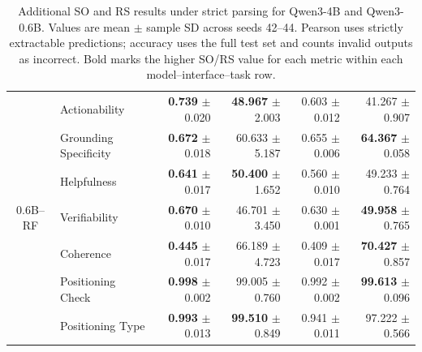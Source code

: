 \begin{table}[!t]
{\begin{tabular*}{\textwidth}{@{\extracolsep{\fill}}clrrrr@{}}
\multirow{7}{*}{0.6B--RF}
& Actionability & \textbf{0.739} $\pm$ 0.020 & \textbf{48.967} $\pm$ 2.003 & 0.603 $\pm$ 0.012 & 41.267 $\pm$ 0.907 \\
& Grounding Specificity & \textbf{0.672} $\pm$ 0.018 & 60.633 $\pm$ 5.187 & 0.655 $\pm$ 0.006 & \textbf{64.367} $\pm$ 0.058 \\
& Helpfulness & \textbf{0.641} $\pm$ 0.017 & \textbf{50.400} $\pm$ 1.652 & 0.560 $\pm$ 0.010 & 49.233 $\pm$ 0.764 \\
& Verifiability & \textbf{0.670} $\pm$ 0.010 & 46.701 $\pm$ 3.450 & 0.630 $\pm$ 0.001 & \textbf{49.958} $\pm$ 0.765 \\
& Coherence & \textbf{0.445} $\pm$ 0.017 & 66.189 $\pm$ 4.723 & 0.409 $\pm$ 0.017 & \textbf{70.427} $\pm$ 0.857 \\
& Positioning Check & \textbf{0.998} $\pm$ 0.002 & 99.005 $\pm$ 0.760 & 0.992 $\pm$ 0.002 & \textbf{99.613} $\pm$ 0.096 \\
& Positioning Type & \textbf{0.993} $\pm$ 0.013 & \textbf{99.510} $\pm$ 0.849 & 0.941 $\pm$ 0.011 & 97.222 $\pm$ 0.566 \\
\bottomrule
\end{tabular*}
}

\caption{Additional SO and RS results under strict parsing for Qwen3-4B
and Qwen3-0.6B. Values are mean $\pm$ sample SD across seeds 42--44.
Pearson uses strictly extractable predictions; accuracy uses the full test
set and counts invalid outputs as incorrect. Bold marks the higher SO/RS
value for each metric within each model--interface--task row.}
\label{tab:full-so-rs-secondary-merged}
\end{table}

